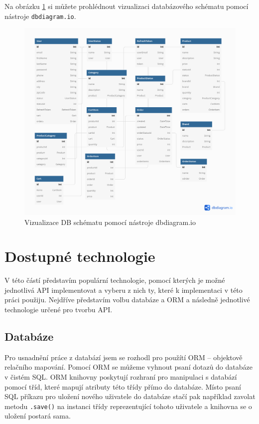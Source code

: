 \documentclass[thesis=M,czech]{FITthesis}[2019/12/23]
\begin{document}
Na obrázku \ref{schema-dbdiagram} si můžete prohlédnout vizualizaci databázového schématu pomocí nástroje \texttt{dbdiagram.io}.

\begin{figure}[h]
    \includegraphics[width=\linewidth]{img/schema-dbdiagram.png}
    \caption{Vizualizace DB schématu pomocí nástroje dbdiagram.io}
	\label{schema-dbdiagram}
\end{figure}

\chapter{Dostupné technologie}
V této částí představím populární technologie, pomocí kterých je možné jednotlivá API implementovat a vyberu z nich ty, které k implementaci v této práci použiju. Nejdříve představím volbu databáze a ORM a následně jednotlivé technologie určené pro tvorbu API.

\section{Databáze}
Pro usnadnění práce z databází jsem se rozhodl pro použítí ORM -- objektově relačního mapování. Pomocí ORM se můžeme vyhnout psaní dotazů do databáze v čistém SQL. ORM knihovny poskytují rozhraní pro manipulaci s databází pomocí tříd, které mapují atributy této třídy přímo do databáze. Místo psaní SQL příkazu pro uložení nového uživatele do databáze stačí pak například zavolat metodu \texttt{.save()} na instanci třídy reprezentující tohoto uživatele a knihovna se o uložení postará sama.
\end{document}
